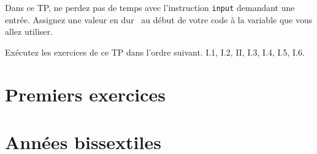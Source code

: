 

\usepackage{parcolumns}
\setlength{\parindent}{0pt}

 
Dans ce TP, ne perdez pas de temps avec l'instruction \texttt{input} demandant une entrée. Assignez une valeur \og en dur\fg~ au début de votre code à la variable que vous allez utiliser.

Exécutez les exercices de ce TP dans l'ordre suivant. I.1, I.2, II, I.3, I.4, I.5, I.6.

\section{Premiers exercices}


\section{Années bissextiles}



